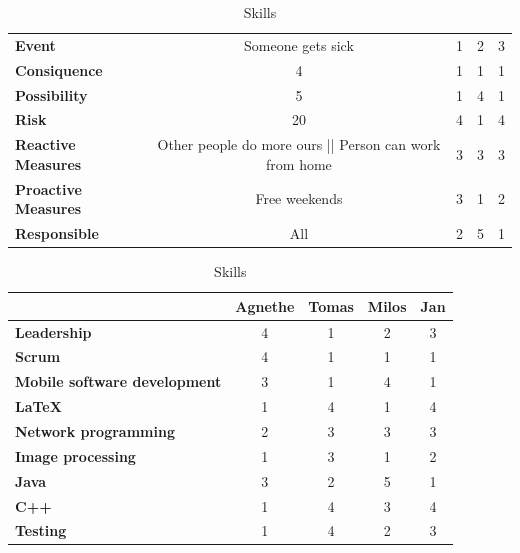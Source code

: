 \documentclass{article}
\newcommand{\ra}[1]{\renewcommand{\arraystretch}{#1}}
\begin{document}
\begin{table}\centering \ra{1.3}
    \caption{Skills}
    \label{tab:skills}
    \vspace{2mm}
    \begin{tabular}{lcccc}
    \toprule
									
    \midrule
    \textbf{Event                	 } & Someone gets sick  		       & 1     & 2     & 3     \\ 
    \textbf{Consiquence              } & 4       					       & 1     & 1     & 1     \\ 
    \textbf{Possibility				 } & 5         						   & 1     & 4     & 1     \\ 
    \textbf{Risk                     } & 20        						   & 4     & 1     & 4     \\ 
    \textbf{Reactive Measures        } & Other people do more ours || Person can work from home         & 3     & 3     & 3     \\ 
    \textbf{Proactive Measures       } & Free weekends        			   & 3     & 1     & 2     \\ 
    \textbf{Responsible              } & All        					   & 2     & 5     & 1     \\ 
   
    \bottomrule
    \end{tabular}
\end{table}

\begin{table}\centering \ra{1.3}
    \caption{Skills}
    \label{tab:skills}
    \vspace{2mm}
    \begin{tabular}{lcccc}
    \toprule
                                & Agnethe   & Tomas & Milos & Jan \\
    \midrule
    \textbf{Leadership                 } & 4         & 1     & 2     & 3     \\ 
    \textbf{Scrum                      } & 4         & 1     & 1     & 1     \\ 
    \textbf{Mobile software development} & 3         & 1     & 4     & 1     \\ 
    \textbf{\LaTeX                     } & 1         & 4     & 1     & 4     \\ 
    \textbf{Network programming        } & 2         & 3     & 3     & 3     \\ 
    \textbf{Image processing           } & 1         & 3     & 1     & 2     \\ 
    \textbf{Java                       } & 3         & 2     & 5     & 1     \\ 
    \textbf{C++                        } & 1         & 4     & 3     & 4     \\ 
    \textbf{Testing                    } & 1         & 4     & 2     & 3     \\
    \bottomrule
    \end{tabular}
\end{table}
\end{document}
